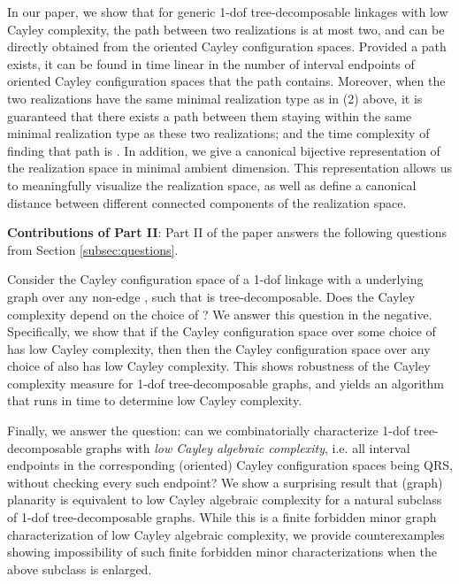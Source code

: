 \documentclass[secthm,amsthm,english]{article}
\theoremstyle{definition}
\theoremstyle{remark}
\begin{document}
\begin{enumerate}[(1)]
	

	In our paper, we  show that for generic 1-dof tree-decomposable linkages with low Cayley complexity, 
	the path between two realizations is at most two, and can be directly obtained from the oriented Cayley configuration spaces. 
	Provided a path exists, it can be found in time linear in the number of interval endpoints of oriented Cayley configuration spaces that the path contains. 
	Moreover, when the two realizations have the same minimal realization type as in (2) above, 
	it is guaranteed that there exists a path between them  staying within the same minimal realization type as these two realizations; 
	and the time complexity of finding that path is . 
    In addition, we give a canonical bijective representation of the realization space in minimal ambient dimension.
    This representation allows us to meaningfully visualize the realization space, as well as define 
    a canonical distance between different connected components of the realization space. 
	

\end{enumerate}




\medskip

\noindent \textbf{Contributions of Part II}:  
Part II of the paper answers the following questions from Section \ref{subsec:questions}. 

Consider the Cayley configuration space of a 1-dof linkage with a underlying graph  over any non-edge , 
such that  is tree-decomposable. 
Does the Cayley complexity  depend on the choice of ? We answer this question in the negative. 
Specifically, 
we show that if the Cayley configuration space over some choice of  has low Cayley complexity, then 
then the Cayley configuration space over any choice of  also has low Cayley complexity.
This shows robustness of the Cayley complexity measure for 1-dof tree-decomposable graphs, 
and yields an algorithm that runs in time  to determine low Cayley complexity.

Finally, we answer the question:  can we combinatorially characterize 1-dof
tree-decomposable graphs  with \emph{low Cayley algebraic complexity}, 	i.e. all interval endpoints in the corresponding (oriented) Cayley configuration spaces being QRS, 
without checking every such endpoint? We show  a surprising result that (graph) planarity is equivalent
to low Cayley algebraic complexity for a natural subclass of 1-dof tree-decomposable graphs. 
While this is a finite forbidden minor graph characterization of
low Cayley algebraic complexity, we provide counterexamples showing impossibility of
such finite forbidden minor characterizations when the above subclass is
enlarged.
\end{document}
